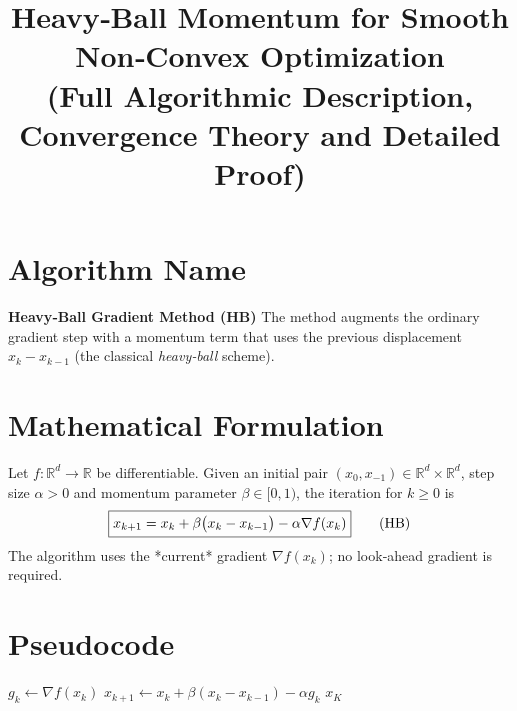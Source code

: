 \documentclass{article}
\begin{document}
\title{Heavy‑Ball Momentum for Smooth Non‑Convex Optimization\\
(Full Algorithmic Description, Convergence Theory and Detailed Proof)}
\author{}
\date{}
\maketitle

\section*{Algorithm Name}
\textbf{Heavy‑Ball Gradient Method (HB)}  
The method augments the ordinary gradient step with a momentum term that
uses the previous displacement $x_k-x_{k-1}$ (the classical \emph{heavy‑ball}
scheme).

\section*{Mathematical Formulation}
Let $f:\mathbb{R}^d\rightarrow\mathbb{R}$ be differentiable.  
Given an initial pair $(x_0,x_{-1})\in\mathbb{R}^d\times\mathbb{R}^d$,
step size $\alpha>0$ and momentum parameter $\beta\in[0,1)$, the iteration
for $k\ge 0$ is
\begin{equation}
\boxed{%
x_{k+1}=x_k+\beta\bigl(x_k-x_{k-1}\bigr)-\alpha \nabla f(x_k)
}\tag{HB}
\end{equation}
The algorithm uses the *current* gradient $\nabla f(x_k)$; no look‑ahead
gradient is required.

\section*{Pseudocode}
\begin{algorithm}[H]
\caption{Heavy‑Ball Gradient Method}
\begin{algorithmic}[1]
\Require{Function $f$, gradient oracle $\nabla f$, step size $\alpha>0$, momentum $\beta\in[0,1)$,
initial points $x_{0},x_{-1}\in\mathbb{R}^{d}$, maximum iterations $K$.}
    \State $g_k \gets \nabla f(x_k)$
    \State $x_{k+1} \gets x_k + \beta (x_k - x_{k-1}) - \alpha g_k$
\EndFor
\State \Return $x_{K}$
\end{algorithmic}
\end{algorithm}
\end{document}
